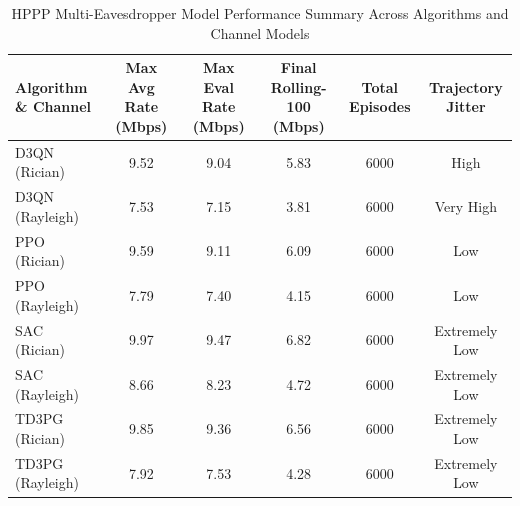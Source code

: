\documentclass[journal,onecolumn]{IEEEtran}
\begin{document}
\begin{table}[t]
\caption{HPPP Multi-Eavesdropper Model Performance Summary Across Algorithms and Channel Models}
\label{tab:hppp_comparison}
\centering
\renewcommand{\arraystretch}{1.15}
\begin{tabular}{lccccc}
\toprule
\textbf{Algorithm \& Channel} &
\textbf{Max Avg Rate (Mbps)} &
\textbf{Max Eval Rate (Mbps)} &
\textbf{Final Rolling-100 (Mbps)} &
\textbf{Total Episodes} &
\textbf{Trajectory Jitter} \\
\midrule

D3QN (Rician)    & 9.52 & 9.04 & 5.83 & 6000 & High \\
D3QN (Rayleigh)  & 7.53 & 7.15 & 3.81 & 6000 & Very High \\
PPO (Rician)     & 9.59 & 9.11 & 6.09 & 6000 & Low \\
PPO (Rayleigh)   & 7.79 & 7.40 & 4.15 & 6000 & Low \\
SAC (Rician)     & 9.97 & 9.47 & 6.82 & 6000 & Extremely Low \\
SAC (Rayleigh)   & 8.66 & 8.23 & 4.72 & 6000 & Extremely Low \\
TD3PG (Rician)   & 9.85 & 9.36 & 6.56 & 6000 & Extremely Low \\
TD3PG (Rayleigh) & 7.92 & 7.53 & 4.28 & 6000 & Extremely Low \\

\bottomrule
\end{tabular}
\end{table}





\end{document}
